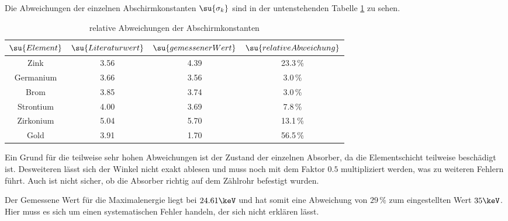 
Die Abweichungen der einzelnen Abschirmkonstanten $\su{\sigma_k}$ sind in der
untenstehenden Tabelle \ref{tab:abw} zu sehen.
\begin{table}
  \centering
  \begin{tabular}{c c c c }
    \toprule
    $\su{Element}$ & $\su{Literaturwert}$ & $\su{gemessener Wert}$ & $\su{relative Abweichung}$ \\
    \midrule
    Zink       & 3.56 & 4.39 & 23.3\,\% \\
    Germanium  & 3.66 & 3.56 &  3.0\,\% \\
    Brom       & 3.85 & 3.74 &  3.0\,\% \\
    Strontium  & 4.00 & 3.69 &  7.8\,\% \\
    Zirkonium  & 5.04 & 5.70 & 13.1\,\% \\
    Gold       & 3.91 & 1.70 & 56.5\,\% \\
    \bottomrule
  \end{tabular}
  \caption{relative Abweichungen der Abschirmkonstanten}
  \label{tab:abw}
\end{table}
Ein Grund für die teilweise sehr hohen Abweichungen ist der Zustand der einzelnen
Absorber, da die Elementschicht teilweise beschädigt ist. Desweiteren lässt sich
der Winkel nicht exakt ablesen und muss noch mit dem Faktor $0.5$ multipliziert
werden, was zu weiteren Fehlern führt. Auch ist nicht
sicher, ob die Absorber richtig auf dem Zählrohr befestigt wurden.

Der Gemessene Wert für die Maximalenergie liegt bei $24.61\keV$ und hat somit
eine Abweichung von $29\,\%$ zum eingestellten Wert $35\keV$. Hier muss es sich
um einen systematischen Fehler handeln, der sich nicht erklären lässt.

